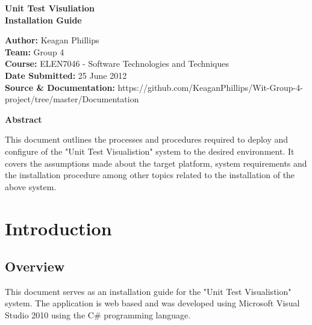 \documentclass[a4paper,12pt]{article}
\begin{document}
\begin{center}
\begin{Huge}
\textbf{{\LARGE Unit Test Visuliation\\Installation Guide }}
\linebreak
\linebreak
\linebreak
\linebreak
\end{Huge}\end{center}




\begin{small}
\begin{flushleft}
\textbf{Author:} Keagan Phillips
\\
\textbf{Team:} Group 4
\\
\textbf{Course:} ELEN7046 - Software Technologies and Techniques
\\
\textbf{Date Submitted:} 25 June 2012
\\
\textbf{Source \& Documentation:} https://github.com/KeaganPhillips/Wit-Group-4-project/tree/master/Documentation
\linebreak
\linebreak
\linebreak
\linebreak
\linebreak
\end{flushleft}

\end{small}


\begin{flushleft}
\textbf{{\large Abstract}}
\end{flushleft}
This document outlines the processes and procedures required to deploy and configure of the "Unit Test Visualistion" system to the desired environment. It covers the assumptions made about the target platform, system requirements and the installation procedure among other topics related to the installation of the above system.
\clearpage


\tableofcontents
\clearpage


\section{Introduction}
\subsection{Overview}
This document serves as an installation guide for the "Unit Test Visualistion" system. The application is web based and was developed using Microsoft Visual Studio 2010\cite{vs2010} using the C\# programming language. 
\end{document}
